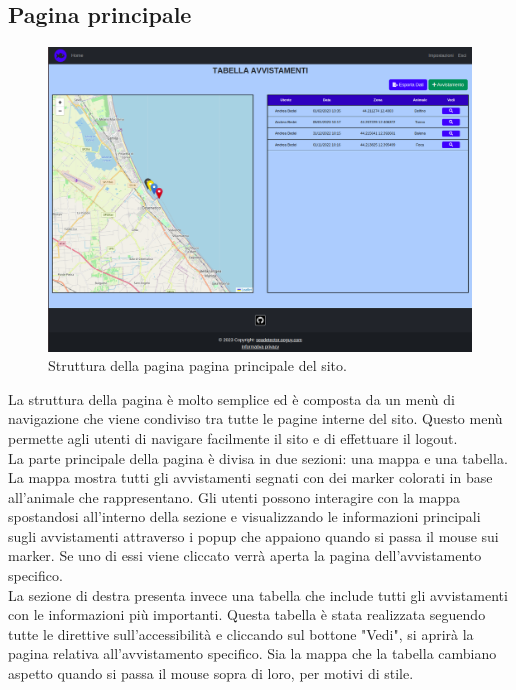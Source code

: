 \documentclass[a4paper,final,12pt]{report}
\begin{document}
\newpage

\subsection{Pagina principale}
\begin{figure}[hbtp]
\centering
\includegraphics[scale=0.27]{img_concettuale/tabellaAvv.png}
\caption{Struttura della pagina pagina principale del sito.}
\end{figure}
La struttura della pagina è molto semplice ed è composta da un menù di navigazione che viene condiviso tra tutte le pagine interne del sito. Questo menù permette agli utenti di navigare facilmente il sito e di effettuare il logout.\\
La parte principale della pagina è divisa in due sezioni: una mappa e una tabella. La mappa mostra tutti gli avvistamenti segnati con dei marker colorati in base all'animale che rappresentano. Gli utenti possono interagire con la mappa spostandosi all'interno della sezione e visualizzando le informazioni principali sugli avvistamenti attraverso i popup che appaiono quando si passa il mouse sui marker. Se uno di essi viene cliccato verrà aperta la pagina dell'avvistamento specifico.\\
La sezione di destra presenta invece una tabella che include tutti gli avvistamenti con le informazioni più importanti. Questa tabella è stata realizzata seguendo tutte le direttive sull'accessibilità e cliccando sul bottone "Vedi", si aprirà la pagina relativa all'avvistamento specifico. Sia la mappa che la tabella cambiano aspetto quando si passa il mouse sopra di loro, per motivi di stile.\\
\end{document}
